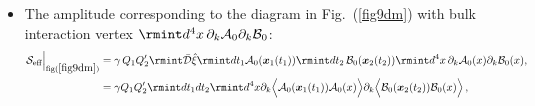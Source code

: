 \begin{itemize}
\begin{align}
\begin{split}
=\gamma Q_1Q_2'\rmint dt\, \,\Big[v_1^i(t) v_2^l(t)\
\rmint \frac{k_i k_l\,e^{-i\boldsymbol{k}\cdot \boldsymbol{r}}}{k^2(\boldsymbol{k}^2+\mu^2)}\Bigg]\,,                 \\ &
=\gamma Q_1 Q_2'\rmint dt \, \Big[(\boldsymbol{v}_1\cdot \boldsymbol{v}_2)\frac{e^{-r \mu _{\gamma }} \left(-r \mu _{\gamma }+e^{r \mu _{\gamma }}-1\right)}{2 \pi  r^3 \mu _{\gamma }^2}\\ &
\,\,\,\,\,\,\,\,\,\,\,\,\,\,\,\,\,\,\,\,\,\,\,\,\,\,\,\,\,\,\,\,\,+(\boldsymbol{v}_1\cdot \Hat{n})(\boldsymbol{v}_2\cdot \Hat{n})\frac{e^{-r \mu _{\gamma }} \Big(r \mu _{\gamma } \left(r \mu _{\gamma }+3\right)-3 e^{r \mu _{\gamma }}+3\Big)}{2 \pi  r^3 \mu _{\gamma }^2}\Big]+(1\leftrightarrow 2) \sim \mathcal{O}(L v^2)\,.
\end{split}
\end{align}
\item The amplitude corresponding to the diagram in Fig.~(\ref{fig9dm}) with bulk interaction vertex $\rmint d^4x\,\partial_k \mathcal{A}_0\partial_k \mathcal{B}_0$:
\begin{align}
    \begin{split}
       \mathcal{S}_{\text{eff}}\Big|_{\text{fig}(\ref{fig9dm})}&=\gamma \,Q_1 Q_2'\rmint\Bar{\mathcal{D}}\Hat{\xi}\rmint dt_1 \mathcal{A}_0(\boldsymbol{x}_1(t_1))\rmint dt_2\, \mathcal{B}_0(\boldsymbol{x}_2(t_2))\rmint d^4x\,\partial_k\mathcal{A}_0(x)\partial_k\mathcal{B}_0(x),\\&
       =\gamma Q_1 Q_2'\rmint dt_1dt_2\rmint d^4x\partial_k\Big{\langle}\mathcal{A}_0(\boldsymbol{x}_1(t_1))\mathcal{A}_0(x)\Big{\rangle}\partial_k\Big{\langle}\mathcal{B}_0(\boldsymbol{x}_2(t_2))\mathcal{B}_0(x)\Big{\rangle}\,,\\ &

\end{split}
\end{align}
\end{itemize}

